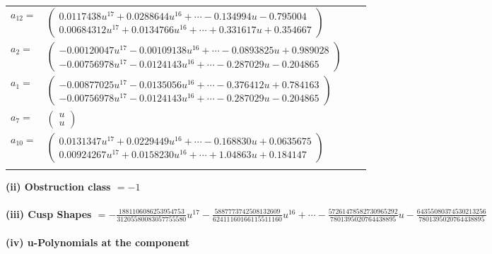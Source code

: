 \documentclass[1p]{elsarticle_modified}
\theoremstyle{definition}
\begin{document}
\begin{tabular}{m{7pt} m{180pt} m{7pt} m{180pt} }
\flushright $a_{12}=$&$\begin{pmatrix}0.0117438 u^{17}+0.0288644 u^{16}+\cdots-0.134994 u-0.795004\\0.00684312 u^{17}+0.0134766 u^{16}+\cdots+0.331617 u+0.354667\end{pmatrix}$ \\
\flushright $a_{2}=$&$\begin{pmatrix}-0.00120047 u^{17}-0.00109138 u^{16}+\cdots-0.0893825 u+0.989028\\-0.00756978 u^{17}-0.0124143 u^{16}+\cdots-0.287029 u-0.204865\end{pmatrix}$ \\
\flushright $a_{1}=$&$\begin{pmatrix}-0.00877025 u^{17}-0.0135056 u^{16}+\cdots-0.376412 u+0.784163\\-0.00756978 u^{17}-0.0124143 u^{16}+\cdots-0.287029 u-0.204865\end{pmatrix}$ \\
\flushright $a_{7}=$&$\begin{pmatrix}u\\u\end{pmatrix}$ \\
\flushright $a_{10}=$&$\begin{pmatrix}0.0131347 u^{17}+0.0229449 u^{16}+\cdots-0.168830 u+0.0635675\\0.00924267 u^{17}+0.0158230 u^{16}+\cdots+1.04863 u+0.184147\end{pmatrix}$\\&\end{tabular}
\flushleft \textbf{(ii) Obstruction class $= -1$}\\~\\
\flushleft \textbf{(iii) Cusp Shapes $= -\frac{1881106086253954753}{31205580083057755580} u^{17}-\frac{5887773742508132609}{62411160166115511160} u^{16}+\cdots-\frac{57261478582730965292}{7801395020764438895} u-\frac{64355080374530213256}{7801395020764438895}$}\\~\\
\newpage\renewcommand{\arraystretch}{1}
\flushleft \textbf{(iv) u-Polynomials at the component}\newline \\
\end{document}
